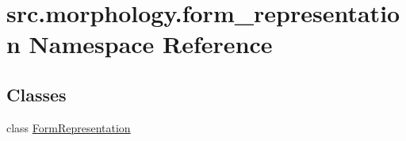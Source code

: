\hypertarget{namespacesrc_1_1morphology_1_1form__representation}{\section{src.\+morphology.\+form\+\_\+representation Namespace Reference}
\label{namespacesrc_1_1morphology_1_1form__representation}
}
\subsection*{Classes}
\begin{DoxyCompactItemize}
\item 
class \hyperlink{classsrc_1_1morphology_1_1form__representation_1_1_form_representation}{Form\+Representation}
\end{DoxyCompactItemize}
